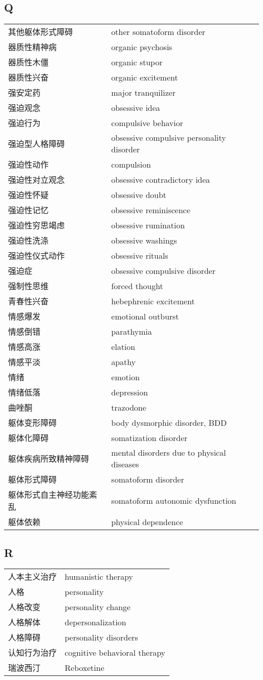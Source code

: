 \subsection*{Q}

\begin{longtable}[]{@{}ll@{}}
\toprule
\endhead
其他躯体形式障碍 & other somatoform disorder\tabularnewline
器质性精神病 & organic psychosis\tabularnewline
器质性木僵 & organic stupor\tabularnewline
器质性兴奋 & organic excitement\tabularnewline
强安定药 & major tranquilizer\tabularnewline
强迫观念 & obsessive idea\tabularnewline
强迫行为 & compulsive behavior\tabularnewline
强迫型人格障碍 & obsessive compulsive personality
disorder\tabularnewline
强迫性动作 & compulsion\tabularnewline
强迫性对立观念 & obsessive contradictory idea\tabularnewline
强迫性怀疑 & obsessive doubt\tabularnewline
强迫性记忆 & obsessive reminiscence\tabularnewline
强迫性穷思竭虑 & obsessive rumination\tabularnewline
强迫性洗涤 & obsessive washings\tabularnewline
强迫性仪式动作 & obsessive rituals\tabularnewline
强迫症 & obsessive compulsive disorder\tabularnewline
强制性思维 & forced thought\tabularnewline
青春性兴奋 & hebephrenic excitement\tabularnewline
情感爆发 & emotional outburst\tabularnewline
情感倒错 & parathymia\tabularnewline
情感高涨 & elation\tabularnewline
情感平淡 & apathy\tabularnewline
情绪 & emotion\tabularnewline
情绪低落 & depression\tabularnewline
曲唑酮 & trazodone\tabularnewline
躯体变形障碍 & body dysmorphic disorder, BDD\tabularnewline
躯体化障碍 & somatization disorder\tabularnewline
躯体疾病所致精神障碍 & mental disorders due to physical
diseases\tabularnewline
躯体形式障碍 & somatoform disorder\tabularnewline
躯体形式自主神经功能紊乱 & somatoform autonomic
dysfunction\tabularnewline
躯体依赖 & physical dependence\tabularnewline
\bottomrule
\end{longtable}

\subsection*{R}

\begin{longtable}[]{@{}ll@{}}
\toprule
\endhead
人本主义治疗 & humanistic therapy\tabularnewline
人格 & personality\tabularnewline
人格改变 & personality change\tabularnewline
人格解体 & depersonalization\tabularnewline
人格障碍 & personality disorders\tabularnewline
认知行为治疗 & cognitive behavioral therapy\tabularnewline
瑞波西汀 & Reboxetine\tabularnewline
\bottomrule
\end{longtable}

